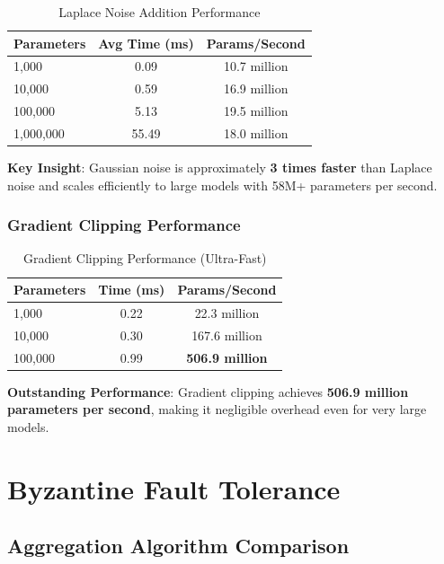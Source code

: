 \documentclass[12pt,a4paper]{article}
\begin{document}
\begin{table}[H]
\centering
\caption{Laplace Noise Addition Performance}
\begin{tabular}{lcc}
\toprule
\textbf{Parameters} & \textbf{Avg Time (ms)} & \textbf{Params/Second} \\
\midrule
1,000 & 0.09 & 10.7 million \\
10,000 & 0.59 & 16.9 million \\
100,000 & 5.13 & 19.5 million \\
1,000,000 & 55.49 & 18.0 million \\
\bottomrule
\end{tabular}
\end{table}

\textbf{Key Insight}: Gaussian noise is approximately \textbf{3 times faster} than Laplace noise and scales efficiently to large models with 58M+ parameters per second.

\subsubsection{Gradient Clipping Performance}

\begin{table}[H]
\centering
\caption{Gradient Clipping Performance (Ultra-Fast)}
\begin{tabular}{lcc}
\toprule
\textbf{Parameters} & \textbf{Time (ms)} & \textbf{Params/Second} \\
\midrule
1,000 & 0.22 & 22.3 million \\
10,000 & 0.30 & 167.6 million \\
100,000 & 0.99 & \textbf{506.9 million} \\
\bottomrule
\end{tabular}
\end{table}

\textbf{Outstanding Performance}: Gradient clipping achieves \textbf{506.9 million parameters per second}, making it negligible overhead even for very large models.

\section{Byzantine Fault Tolerance}

\subsection{Aggregation Algorithm Comparison}
\end{document}
